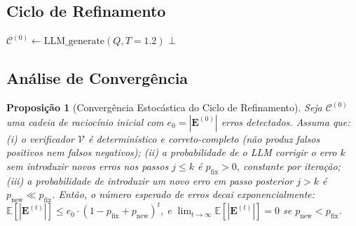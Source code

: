 \documentclass[5p]{elsarticle}
\newtheorem{proposition}[theorem]{Proposição}
\theoremstyle{remark}
\begin{document}
\subsection{Ciclo de Refinamento}

\begin{algorithm}[t]
\SetAlgoLined
{}
$\mathcal{C}^{(0)} \leftarrow \text{LLM\_generate}(Q, T=1.2)$ 
\Return $\bot$ 
\caption{cora\_cycle($Q, M$)}
\label{alg:cora}
\end{algorithm}

\subsection{Análise de Convergência}

\begin{proposition}[Convergência Estocástica do Ciclo de Refinamento]
Seja $\mathcal{C}^{(0)}$ uma cadeia de raciocínio inicial com $e_0 = |\mathbf{E}^{(0)}|$ erros detectados. Assuma que: (i) o verificador $\mathcal{V}$ é determinístico e correto-completo (não produz falsos positivos nem falsos negativos); (ii) a probabilidade de o LLM corrigir o erro $k$ sem introduzir novos erros nos passos $j \leq k$ é $p_{\text{fix}} > 0$, constante por iteração; (iii) a probabilidade de introduzir um novo erro em passo posterior $j > k$ é $p_{\text{new}} \ll p_{\text{fix}}$. Então, o número esperado de erros decai exponencialmente: $\mathbb{E}[|\mathbf{E}^{(t)}|] \leq e_0 \cdot (1 - p_{\text{fix}} + p_{\text{new}})^t$, e $\lim_{t\to\infty} \mathbb{E}[|\mathbf{E}^{(t)}|] = 0$ se $p_{\text{new}} < p_{\text{fix}}$.
\end{proposition}
\end{document}
